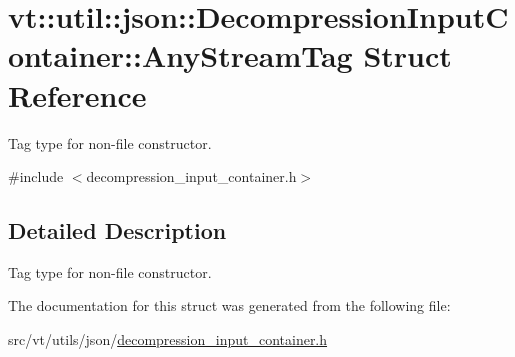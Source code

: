 \hypertarget{structvt_1_1util_1_1json_1_1_decompression_input_container_1_1_any_stream_tag}{}\section{vt\+:\+:util\+:\+:json\+:\+:Decompression\+Input\+Container\+:\+:Any\+Stream\+Tag Struct Reference}
\label{structvt_1_1util_1_1json_1_1_decompression_input_container_1_1_any_stream_tag}


Tag type for non-\/file constructor.  




{\ttfamily \#include $<$decompression\+\_\+input\+\_\+container.\+h$>$}



\subsection{Detailed Description}
Tag type for non-\/file constructor. 

The documentation for this struct was generated from the following file\+:\begin{DoxyCompactItemize}
\item 
src/vt/utils/json/\hyperlink{decompression__input__container_8h}{decompression\+\_\+input\+\_\+container.\+h}\end{DoxyCompactItemize}
